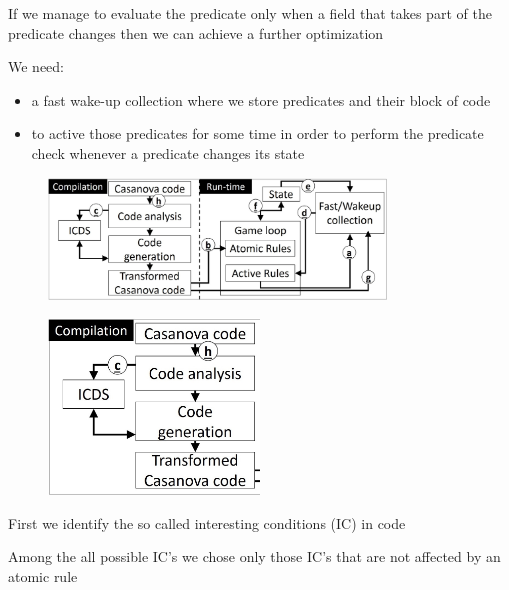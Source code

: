 \documentclass{beamer}
\begin{document}
\begin{slide}{
\item If we manage to evaluate the predicate only when a field that takes part of the predicate changes then we can achieve a further optimization
\pause
\item We need:
\begin{itemize}
\item a fast wake-up collection where we store predicates and their block of code
\item to active those predicates for some time in order to perform the predicate check whenever a predicate changes its state
\end{itemize}
}\end{slide}





\begin{slide}{
\item[]
\centering
\begin{figure}
\includegraphics[width = 0.8\textwidth]{Figures/system_description}
\end{figure}
}\end{slide}

\begin{slide}{
\item[]
\begin{figure}
\centering
\includegraphics[width = 0.5\textwidth]{Figures/system_description 1}
\end{figure}
\item First we identify the so called interesting conditions (IC) in code
\item Among the all possible IC's we chose only those IC's that are not affected by an atomic rule
}\end{slide}
\end{document}
